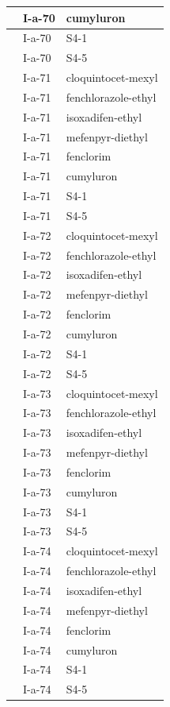 \documentclass[11pt,a4paper]{article}
\begin{document}
\begin{table}[h]
\begin{tabular}{|l|l|l|}
 & I-a-70 & cumyluron \\ \hline
 & I-a-70 & S4-1 \\ \hline
 & I-a-70 & S4-5 \\ \hline
 & I-a-71 & cloquintocet-mexyl \\ \hline
 & I-a-71 & fenchlorazole-ethyl \\ \hline
 & I-a-71 & isoxadifen-ethyl \\ \hline
 & I-a-71 & mefenpyr-diethyl \\ \hline
 & I-a-71 & fenclorim \\ \hline
 & I-a-71 & cumyluron \\ \hline
 & I-a-71 & S4-1 \\ \hline
 & I-a-71 & S4-5 \\ \hline
 & I-a-72 & cloquintocet-mexyl \\ \hline
 & I-a-72 & fenchlorazole-ethyl \\ \hline
 & I-a-72 & isoxadifen-ethyl \\ \hline
 & I-a-72 & mefenpyr-diethyl \\ \hline
 & I-a-72 & fenclorim \\ \hline
 & I-a-72 & cumyluron \\ \hline
 & I-a-72 & S4-1 \\ \hline
 & I-a-72 & S4-5 \\ \hline
 & I-a-73 & cloquintocet-mexyl \\ \hline
 & I-a-73 & fenchlorazole-ethyl \\ \hline
 & I-a-73 & isoxadifen-ethyl \\ \hline
 & I-a-73 & mefenpyr-diethyl \\ \hline
 & I-a-73 & fenclorim \\ \hline
 & I-a-73 & cumyluron \\ \hline
 & I-a-73 & S4-1 \\ \hline
 & I-a-73 & S4-5 \\ \hline
 & I-a-74 & cloquintocet-mexyl \\ \hline
 & I-a-74 & fenchlorazole-ethyl \\ \hline
 & I-a-74 & isoxadifen-ethyl \\ \hline
 & I-a-74 & mefenpyr-diethyl \\ \hline
 & I-a-74 & fenclorim \\ \hline
 & I-a-74 & cumyluron \\ \hline
 & I-a-74 & S4-1 \\ \hline
 & I-a-74 & S4-5 \\ \hline

\end{tabular}
\end{table}
\end{document}
